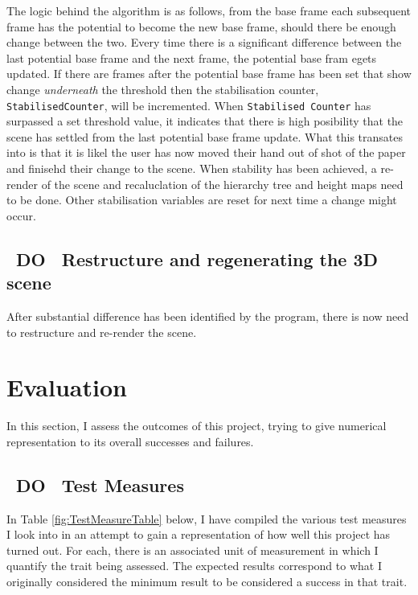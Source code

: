 \documentclass[11pt]{article}
\begin{document}
The logic behind the algorithm is as follows, from the base frame
each subsequent frame has the potential to become the new base frame, should
there be enough change between the two. Every time there is a significant 
difference between the last potential base frame and the next frame, the
potential base fram egets updated. If there are frames after the potential
base frame has been set that show change \textit{underneath} the threshold
then the stabilisation counter, \texttt{StabilisedCounter}, will be 
incremented. When \texttt{Stabilised Counter} has surpassed a set threshold
value, it indicates that there is high posibility that the scene has
settled from the last potential base frame update. What this transates
into is that it is likel the user has now moved their hand out of shot of the
paper and finisehd their change to the scene. When stability has been
achieved, a re-render of the scene and recaluclation of the hierarchy tree 
and height maps need to be done. Other stabilisation variables are reset for
next time a change might occur.

\subsection{~DO~ Restructure and regenerating the 3D scene}
After substantial difference has been identified by the program, there is
now need to restructure and re-render the scene.



\section{Evaluation}
In this section, I assess the outcomes of this project, trying to 
give numerical representation to its overall successes and failures.

\subsection{~DO~ Test Measures}
In Table \ref{fig:TestMeasureTable} below, I have compiled the various 
test measures I look into in an attempt to gain a representation of how 
well this project has turned out. For each, there is an associated 
unit of measurement in which I quantify the trait being assessed. 
The expected results correspond to what I originally considered the 
minimum result to be considered a success in that trait.
\end{document}
